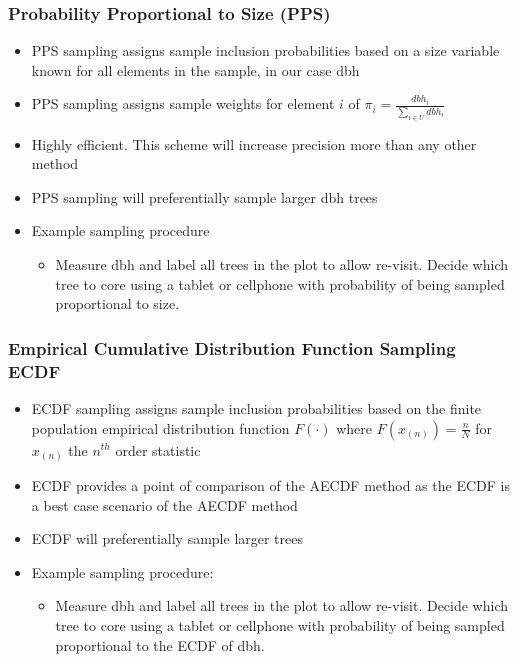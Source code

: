 \documentclass{beamer}
\begin{document}
%
\begin{frame}
  \frametitle{Probability Proportional to Size (PPS)}
  \begin{itemize}
    \item PPS sampling assigns sample inclusion probabilities based on a size variable known for all elements in the sample, in our case dbh \vspace{3mm}
    \item PPS sampling assigns sample weights for element $i$ of $\pi_i = \frac{dbh_i} {\sum_{i \in U} dbh_i}$ \vspace{3mm}
    \item Highly efficient. This scheme will increase precision more than any other method \vspace{3mm}
    \item PPS sampling will preferentially sample larger dbh trees \vspace{3mm}
    \item Example sampling procedure \vspace{3mm}
    \begin{itemize}
      \item Measure dbh and label all trees in the plot to allow re-visit. Decide which tree to core using a tablet or cellphone with probability of being sampled proportional to size.
    \end{itemize}
  \end{itemize}
\end{frame}
%
\begin{frame}
  \frametitle{Empirical Cumulative Distribution Function Sampling ECDF}
  \begin{itemize} 
    \item ECDF sampling assigns sample inclusion probabilities based on the finite population empirical distribution function $F(\cdot)$ where $F(x_{(n)}) = \frac{n} {N}$ for $x_{(n)}$ the $n^{th}$ order statistic \vspace{3mm}
    \item ECDF provides a point of comparison of the AECDF method as the ECDF is a best case scenario of the AECDF method \vspace{3mm}
    \item ECDF will preferentially sample larger trees \vspace{3mm}
    \item Example sampling procedure: \vspace{3mm}
    \begin{itemize}
      \item  Measure dbh and label all trees in the plot to allow re-visit. Decide which tree to core using a tablet or cellphone with probability of being sampled proportional to the ECDF of dbh.
    \end{itemize}
  \end{itemize}    
\end{frame}
\end{document}
